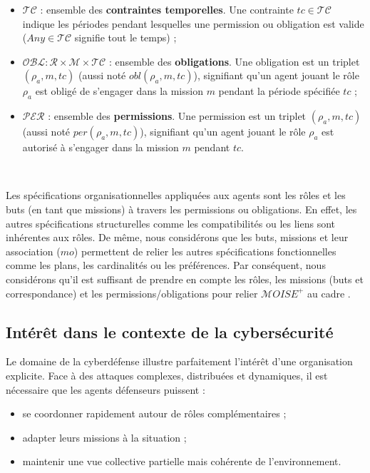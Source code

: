 \begin{itemize}
    \item $\mathcal{TC}$ : ensemble des \textbf{contraintes temporelles}. Une contrainte $tc \in \mathcal{TC}$ indique les périodes pendant lesquelles une permission ou obligation est valide ($Any \in \mathcal{TC}$ signifie tout le temps) ;
    \item $\mathcal{OBL}: \mathcal{R} \times \mathcal{M} \times \mathcal{TC}$ : ensemble des \textbf{obligations}. Une obligation est un triplet $(\rho_a, m, tc)$ (aussi noté $obl(\rho_a, m, tc)$), signifiant qu'un agent jouant le rôle $\rho_a$ est obligé de s'engager dans la mission $m$ pendant la période spécifiée $tc$ ;
    \item $\mathcal{PER}$ : ensemble des \textbf{permissions}. Une permission est un triplet $(\rho_a, m, tc)$ (aussi noté $per(\rho_a, m, tc)$), signifiant qu'un agent jouant le rôle $\rho_a$ est autorisé à s'engager dans la mission $m$ pendant $tc$.
\end{itemize}

\

\noindent Les spécifications organisationnelles appliquées aux agents sont les rôles et les buts (en tant que missions) à travers les permissions ou obligations. En effet, les autres spécifications structurelles comme les compatibilités ou les liens sont inhérentes aux rôles. De même, nous considérons que les buts, missions et leur association ($mo$) permettent de relier les autres spécifications fonctionnelles comme les plans, les cardinalités ou les préférences.  
Par conséquent, nous considérons qu'il est suffisant de prendre en compte les rôles, les missions (buts et correspondance) et les permissions/obligations pour relier $\mathcal{M}OISE^+$ au cadre .



\subsection{Intérêt dans le contexte de la cybersécurité}

Le domaine de la cyberdéfense illustre parfaitement l'intérêt d'une organisation explicite. Face à des attaques complexes, distribuées et dynamiques, il est nécessaire que les agents défenseurs puissent :
\begin{itemize}
    \item se coordonner rapidement autour de rôles complémentaires ;
    \item adapter leurs missions à la situation ;
    \item maintenir une vue collective partielle mais cohérente de l'environnement.
\end{itemize}

